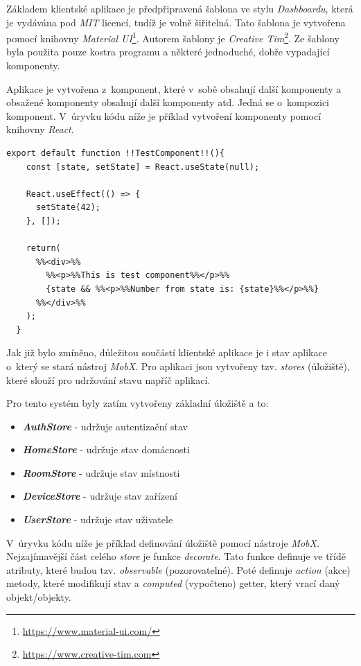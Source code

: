 Základem klientské aplikace je předpřipravená šablona ve stylu \emph{Dashboardu}, která je vydávána pod \emph{MIT} licencí, tudíž je volně šiřitelná.
Tato šablona je vytvořena pomocí knihovny \emph{Material UI}\footnote{\url{https://www.material-ui.com/}}. Autorem šablony je \emph{Creative Tim}\footnote{\url{https://www.creative-tim.com}}.
Ze šablony byla použita pouze kostra programu a některé jednoduché, dobře vypadající komponenty.

Aplikace je vytvořena z~komponent, které v~sobě obsahují další komponenty a obsažené komponenty obsahují další komponenty atd.
Jedná se o~kompozici komponent.
V~úryvku kódu níže je příklad vytvoření komponenty pomocí knihovny \emph{React}.

\begin{lstlisting}[style=JavaScriptStyle,caption={Ukázka definování komponenty}]
  export default function !!TestComponent!!(){
    const [state, setState] = React.useState(null);

    React.useEffect(() => {
      setState(42);
    }, []);
    
    return(
      %%<div>%%
        %%<p>%%This is test component%%</p>%%
        {state && %%<p>%%Number from state is: {state}%%</p>%%}
      %%</div>%%
    );
  }
\end{lstlisting}

Jak již bylo zmíněno, důležitou součástí klientské aplikace je i stav aplikace o~který se stará nástroj \emph{MobX}.
Pro aplikaci jsou vytvořeny tzv. \emph{stores} (úložiště), které slouží pro udržování stavu napříč aplikací.
\newline

Pro tento systém byly zatím vytvořeny základní úložiště a to:
\begin{itemize}
  \item \textbf{\emph{AuthStore}} - udržuje autentizační stav
  \item \textbf{\emph{HomeStore}} - udržuje stav domácnosti
  \item \textbf{\emph{RoomStore}} - udržuje stav místnosti
  \item \textbf{\emph{DeviceStore}} - udržuje stav zařízení
  \item \textbf{\emph{UserStore}} - udržuje stav uživatele
\end{itemize}

\newpage
V~úryvku kódu níže je příklad definování úložiště pomocí nástroje \emph{MobX}.
Nejzajímavější část celého \emph{store} je funkce \emph{decorate}.
Tato funkce definuje ve třídě atributy, které budou tzv. \emph{observable} (pozorovatelné).
Poté definuje \emph{action} (akce) metody,
které modifikují stav a \emph{computed} (vypočteno) getter, který vrací daný objekt/objekty.

